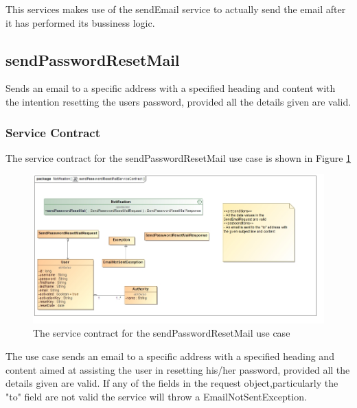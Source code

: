 This services makes use of the sendEmail service to actually send the email after
it has performed its bussiness logic.

\subsection{sendPasswordResetMail}
Sends an email to a specific address with a specified heading and content
with the intention resetting the users password, provided all the details 
given are valid.

\subsubsection{Service Contract}
The service contract for the sendPasswordResetMail use case is shown in Figure \ref{sendPasswordResetMailServiceContract}
\begin{figure}[H]
	\begin{center}
		\includegraphics[scale=0.5]{../Diagrams and Charts/Notifications/sendPasswordResetMailServiceContract.jpg}
		\caption{The service contract for the sendPasswordResetMail use case}
		\label{sendPasswordResetMailServiceContract}
	\end{center}
\end{figure}
	
The use case sends an email to a specific address with a specified heading and content
aimed at assisting the user in resetting his/her password, provided all the details
given are valid. If any of the fields in the request object,particularly the "to" field
are not valid the service will throw a EmailNotSentException.

